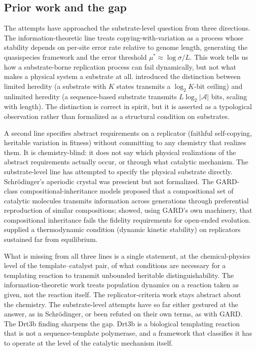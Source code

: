 \documentclass[aps,prx,reprint,amsmath,amssymb,floatfix,superscriptaddress,nofootinbib]{revtex4-2}
\theoremstyle{plain-thm}
\theoremstyle{definition-thm}
\begin{document}
\subsection{Prior work and the gap}

The attempts have approached the substrate-level question from three directions. The information-theoretic line \citep{Eigen1971, EigenMcCaskillSchuster1989, Szathmary2000} treats copying-with-variation as a process whose stability depends on per-site error rate relative to genome length, generating the quasispecies framework and the error threshold $\mu^* \approx \log \sigma / L$. This work tells us how a substrate-borne replication process can fail dynamically, but not what makes a physical system a substrate at all. \citet{Szathmary2000} introduced the distinction between limited heredity (a substrate with $K$ states transmits a $\log_2 K$-bit ceiling) and unlimited heredity (a sequence-based substrate transmits $L \log_2 |\mathcal{A}|$ bits, scaling with length). The distinction is correct in spirit, but it is asserted as a typological observation rather than formalized as a structural condition on substrates.

A second line \citep{Hull1980, MaynardSmith2000} specifies abstract requirements on a replicator (faithful self-copying, heritable variation in fitness) without committing to any chemistry that realizes them. It is chemistry-blind: it does not say which physical realizations of the abstract requirements actually occur, or through what catalytic mechanism. The substrate-level line has attempted to specify the physical substrate directly. Schr\"odinger's aperiodic crystal \citep{Schrodinger1944} was prescient but not formalized. The GARD-class compositional-inheritance models \citep{Kauffman1986, Hordijk2012} proposed that a compositional set of catalytic molecules transmits information across generations through preferential reproduction of similar compositions; \citet{Vasas2010} showed, using GARD's own machinery, that compositional inheritance fails the fidelity requirements for open-ended evolution. \citet{Pross2011} supplied a thermodynamic condition (dynamic kinetic stability) on replicators sustained far from equilibrium.

What is missing from all three lines is a single statement, at the chemical-physics level of the template--catalyst pair, of what conditions are necessary for a templating reaction to transmit unbounded heritable distinguishability. The information-theoretic work treats population dynamics on a reaction taken as given, not the reaction itself. The replicator-criteria work stays abstract about the chemistry. The substrate-level attempts have so far either gestured at the answer, as in Schr\"odinger, or been refuted on their own terms, as with GARD. The Drt3b finding sharpens the gap. Drt3b is a biological templating reaction that is not a sequence-template polymerase, and a framework that classifies it has to operate at the level of the catalytic mechanism itself.
\end{document}
